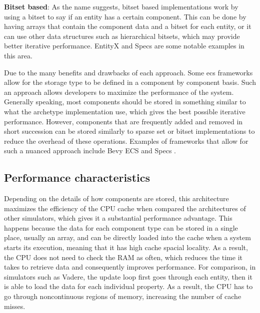 \documentclass[twoside, 11pt]{article}
\begin{document}
\textbf{Bitset based}: As the name suggests, bitset based implementations work by using a bitset to say if an entity has a certain component. This can be done by having arrays that contain the component data and a bitset for each entity, or it can use other data structures such as hierarchical bitsets, which may provide better iterative performance. EntityX \cite{entityx} and Specs \cite{specs} are some notable examples in this area.

Due to the many benefits and drawbacks of each approach. Some \gls{ecs} frameworks allow for the storage type to be defined in a component by component basis. Such an approach allows developers to maximize the performance of the system. Generally speaking, most components should be stored in something similar to what the archetype implementation use, which gives the best possible iterative performance. However, components that are frequently added and removed in short succession can be stored similarly to sparse set or bitset implementations to reduce the overhead of these operations. Examples of frameworks that allow for such a nuanced approach include Bevy ECS \cite{bevy} and Specs \cite{specs}.

\subsection{Performance characteristics}

Depending on the details of how components are stored, this architecture maximizes the efficiency of the CPU cache when compared the architectures of other simulators, which gives it a substantial performance advantage. This happens because the data for each component type can be stored in a single place, usually an array, and can be directly loaded into the cache when a system starts its execution, meaning that it has high cache spacial locality. As a result, the CPU does not need to check the RAM as often, which reduces the time it takes to retrieve data and consequently improves performance. For comparison, in simulators such as Vadere, the update loop first goes through each entity, then it is able to load the data for each individual property. As a result, the CPU has to go through noncontinuous regions of memory, increasing the number of cache misses.
\end{document}
